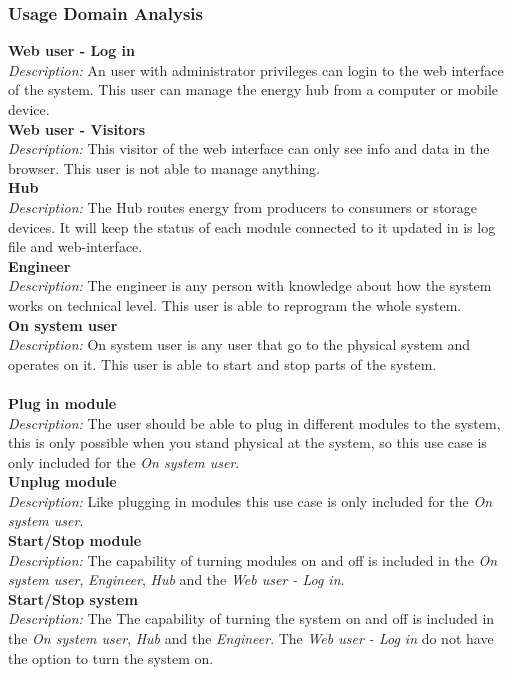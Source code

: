 	\subsubsection{Usage Domain Analysis}
		\textbf{Web user - Log in}
		\\\textit{Description: }
		An user with administrator privileges can login to the web interface of the system. This user can manage the energy hub from a computer or mobile device.
		\\\textbf{Web user - Visitors}
		\\\textit{Description: }
		This visitor of the web interface can only see info and data in the browser. This user is not able to manage anything.
		\\\textbf{Hub}
		\\\textit{Description: }
		The Hub routes energy from producers to consumers or storage devices. It will keep the status of each module connected to it updated in is log file and web-interface.
		\\\textbf{Engineer}
		\\\textit{Description: }
		The engineer is any person with knowledge about how the system works on technical level. This user is able to reprogram the whole system.
		\\\textbf{On system user}
		\\\textit{Description: }
		On system user is any user that go to the physical system and operates on it. This user is able to start and stop parts of the system.
		\\\\\textbf{Plug in module}
		\\\textit{Description: }
		The user should be able to plug in different modules to the system, this is only possible when you stand physical at the system, so this use case is only included for the \textit{On system user}.
		\\\textbf{Unplug module}
		\\\textit{Description: }
		Like plugging in modules this use case is only included for the \textit{On system user}.
		\\\textbf{Start/Stop module}
		\\\textit{Description: }
		The capability of turning modules on and off is included in the \textit{On system user}, \textit{Engineer}, \textit{Hub} and the \textit{Web user - Log in}.
		\\\textbf{Start/Stop system}
		\\\textit{Description: }
		The The capability of turning the system on and off is included in the \textit{On system user}, \textit{Hub} and the \textit{Engineer}. The \textit{Web user - Log in} do not have the option to turn the system on.
